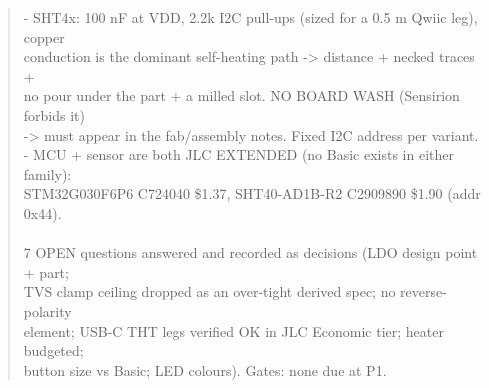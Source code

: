 \documentclass[11pt,a4paper]{article}
\begin{document}
\begin{quote}
- SHT4x: 100 nF at VDD, 2.2k I2C pull-ups (sized for a 0.5 m Qwiic leg), copper\\
  conduction is the dominant self-heating path -\textgreater{} distance + necked traces +\\
  no pour under the part + a milled slot. NO BOARD WASH (Sensirion forbids it)\\
  -\textgreater{} must appear in the fab/assembly notes. Fixed I2C address per variant.\\
- MCU + sensor are both JLC EXTENDED (no Basic exists in either family):\\
  STM32G030F6P6 C724040 \$1.37, SHT40-AD1B-R2 C2909890 \$1.90 (addr 0x44).\\
~\\
7 OPEN questions answered and recorded as decisions (LDO design point + part;\\
TVS clamp ceiling dropped as an over-tight derived spec; no reverse-polarity\\
element; USB-C THT legs verified OK in JLC Economic tier; heater budgeted;\\
button size vs Basic; LED colours). Gates: none due at P1.
\end{quote}
\end{document}
